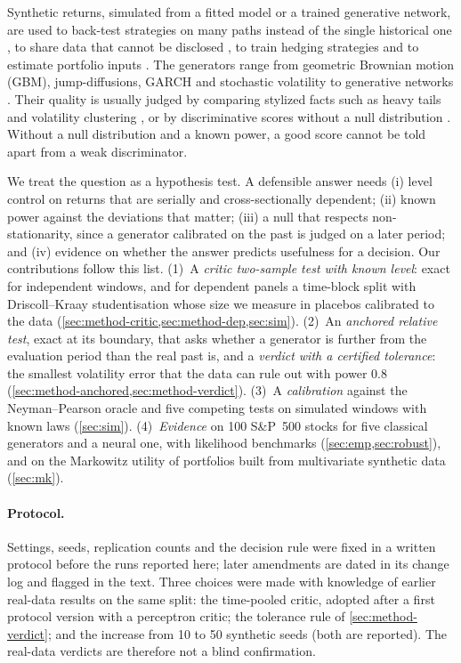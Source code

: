 \documentclass[11pt,a4paper]{article}
\theoremstyle{plain}
\begin{document}
Synthetic returns, simulated from a fitted model or a trained generative network, are used to
back-test strategies on many paths instead of the single historical one
\citep{bailey2017probability}, to share data that cannot be disclosed \citep{assefa2020generating},
to train hedging strategies \citep{buehler2019deep} and to estimate portfolio inputs
\citep{cetingoz2026synthetic}. The generators range from geometric Brownian motion (GBM),
jump-diffusions, GARCH and stochastic volatility to generative networks
\citep{wiese2020quant,buehler2020data,ni2021sig}. Their quality is usually judged by comparing
stylized facts such as heavy tails and volatility clustering \citep{cont2001empirical}, or by
discriminative scores without a null distribution \citep{yoon2019time,stenger2024evaluation}.
Without a null distribution and a known power, a good score cannot be told apart from a weak
discriminator.

We treat the question as a hypothesis test. A defensible answer needs (i) level control on returns
that are serially and cross-sectionally dependent; (ii) known power against the deviations that
matter; (iii) a null that respects non-stationarity, since a generator calibrated on the past is
judged on a later period; and (iv) evidence on whether the answer predicts usefulness for a
decision. Our contributions follow this list.
(1)~A \emph{critic two-sample test with known level}: exact for independent windows, and for
dependent panels a time-block split with Driscoll--Kraay studentisation whose size we measure in
placebos calibrated to the data (\cref{sec:method-critic,sec:method-dep,sec:sim}).
(2)~An \emph{anchored relative test}, exact at its boundary, that asks whether a generator is
further from the evaluation period than the real past is, and a \emph{verdict with a certified
tolerance}: the smallest volatility error that the data can rule out with power 0.8
(\cref{sec:method-anchored,sec:method-verdict}).
(3)~A \emph{calibration} against the Neyman--Pearson oracle and five competing tests on simulated
windows with known laws (\cref{sec:sim}).
(4)~\emph{Evidence} on 100 S\&P~500 stocks for five classical generators and a neural one, with
likelihood benchmarks (\cref{sec:emp,sec:robust}), and on the Markowitz utility of portfolios built
from multivariate synthetic data (\cref{sec:mk}).

\paragraph{Protocol.} Settings, seeds, replication counts and the decision rule were fixed in a
written protocol before the runs reported here; later amendments are dated in its change log and
flagged in the text. Three choices were made with knowledge of earlier real-data results on the same
split: the time-pooled critic, adopted after a first protocol version with a perceptron critic; the
tolerance rule of \cref{sec:method-verdict}; and the increase from 10 to 50 synthetic seeds (both
are reported). The real-data verdicts are therefore not a blind confirmation.
\end{document}
